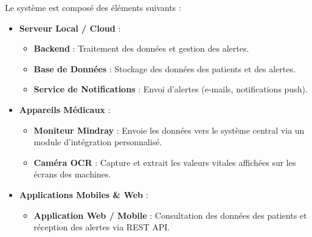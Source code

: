 Le système est composé des éléments suivants :

\begin{itemize}
    \item \textbf{Serveur Local / Cloud} :
    \begin{itemize}
        \item \textbf{Backend} : Traitement des données et gestion des alertes.
        \item \textbf{Base de Données} : Stockage des données des patients et des alertes.
        \item \textbf{Service de Notifications} : Envoi d’alertes (e-mails, notifications push).
    \end{itemize}
    
    \item \textbf{Appareils Médicaux} :
    \begin{itemize}
        \item \textbf{Moniteur Mindray} : Envoie les données vers le système central via un module d'intégration personnalisé.
        \item \textbf{Caméra OCR} : Capture et extrait les valeurs vitales affichées sur les écrans des machines.
    \end{itemize}
    
    \item \textbf{Applications Mobiles \& Web} :
    \begin{itemize}
        \item \textbf{Application Web / Mobile} : Consultation des données des patients et réception des alertes via REST API.
    \end{itemize}
\end{itemize}

